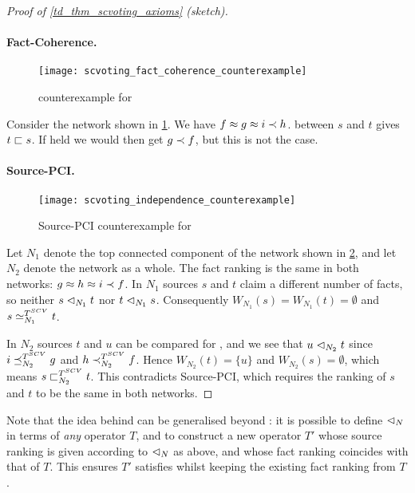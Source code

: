 \begin{proof}[Proof of \cref{td_thm_scvoting_axioms} (sketch)]
\paragraph{Fact-Coherence.}

\begin{figure}
    \centering
    \texttt{[image: scvoting\_fact\_coherence\_counterexample]}
    \caption{
        \factcoherence{} counterexample for \scvoting{}
    }
    \label{td_fig_scvoting_fact_coherence_counterexample}
\end{figure}

Consider the network shown in
\cref{td_fig_scvoting_fact_coherence_counterexample}. We have $f \approx g \approx i
    \prec h$. \sourcecoherence{} between $s$ and $t$ gives $t \sqsubset s$. If
    \factcoherence{} held we would then get $g \prec f$, but this is not the case.

\paragraph{Source-PCI.}

\begin{figure}
    \centering
    \texttt{[image: scvoting\_independence\_counterexample]}
    \caption{
        Source-PCI counterexample for \scvoting{}
    }
    \label{td_fig_scvoting_independence_counterexample}
\end{figure}

Let $N_1$ denote the top connected component of the network shown in
\cref{td_fig_scvoting_independence_counterexample}, and let $N_2$ denote the
network as a whole. The fact ranking is the same in both networks: $g \approx h
\approx i \prec f$.  In $N_1$ sources $s$ and $t$ claim a different number of
facts, so neither $s \mathrel{\lhd}_{N_1} t$ nor $t \mathrel{\lhd}_{N_1} s$. Consequently
$W_{N_1}(s) = W_{N_1}(t) = \emptyset$ and $s \simeq_{N_1}^{T^{SCV}} t$.

In $N_2$ sources $t$ and $u$ can be compared for \sourcecoherence{}, and we see
that $u \mathrel{\lhd}_{N_2} t$ since $i \preceq_{N_2}^{T^{SCV}} g$ and $h
\prec_{N_2}^{T^{SCV}} f$. Hence $W_{N_2}(t) = \{u\}$ and $W_{N_2}(s) =
\emptyset$, which means $s \sqsubset_{N_2}^{T^{SCV}} t$. This contradicts
Source-PCI, which requires the ranking of $s$ and $t$ to be the same in both
networks.  \end{proof}

Note that the idea behind \scvoting{} can be generalised
beyond \voting{}: it is possible to define $\mathrel{\lhd}_N$ in terms of \emph{any}
operator $T$, and to construct a new operator $T'$ whose source ranking is
given according to $\mathrel{\lhd}_N$ as above, and whose fact ranking coincides with
that of $T$. This ensures $T'$ satisfies \sourcecoherence{} whilst keeping the
existing fact ranking from $T$.

